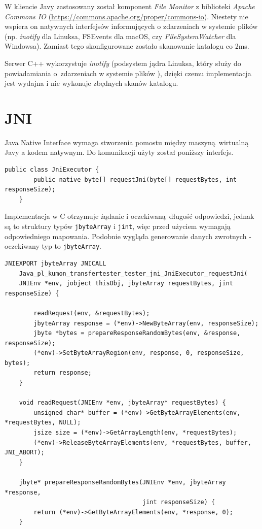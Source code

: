 W kliencie Javy zastosowany został komponent \textit{File Monitor} z biblioteki \textit{Apache Commons IO} (\url{https://commons.apache.org/proper/commons-io}). Niestety nie wspiera on natywnych interfejsów informujących o zdarzeniach w systemie plików (np. \textit{inotify} dla Linuksa, FSEvents dla macOS, czy \textit{FileSystemWatcher} dla Windowsa). Zamiast tego skonfigurowane zostało skanowanie katalogu co 2ms.

Serwer C++ wykorzystuje \textit{inotify} (podsystem jądra Linuksa, który służy do powiadamiania o~zdarzeniach w systemie plików \cite{inotify_man}), dzięki czemu implementacja jest wydajna i nie wykonuje zbędnych skanów katalogu.


\section{JNI}

Java Native Interface wymaga stworzenia pomostu między maszyną wirtualną Javy a kodem natywnym. Do komunikacji użyty został poniższy interfejs.

\begin{lstlisting}[caption={Metoda javy, która wymaga natywnej implementacji.},captionpos=b]
    public class JniExecutor {
        public native byte[] requestJni(byte[] requestBytes, int responseSize);
    }
\end{lstlisting}

Implementacja w C otrzymuje żądanie i oczekiwaną długość odpowiedzi, jednak są to struktury typów \texttt{jbyteArray} i \texttt{jint}, więc przed użyciem wymagają odpowiedniego mapowania. Podobnie wygląda generowanie danych zwrotnych - oczekiwany typ to \texttt{jbyteArray}.

\begin{lstlisting}[caption={Natywna implementacja w C.},captionpos=b]
    JNIEXPORT jbyteArray JNICALL 
    Java_pl_kumon_transfertester_tester_jni_JniExecutor_requestJni(
    JNIEnv *env, jobject thisObj, jbyteArray requestBytes, jint responseSize) {

        readRequest(env, &requestBytes);
        jbyteArray response = (*env)->NewByteArray(env, responseSize);
        jbyte *bytes = prepareResponseRandomBytes(env, &response, responseSize);
        (*env)->SetByteArrayRegion(env, response, 0, responseSize, bytes);
        return response;
    }

    void readRequest(JNIEnv *env, jbyteArray* requestBytes) {
        unsigned char* buffer = (*env)->GetByteArrayElements(env, *requestBytes, NULL);
        jsize size = (*env)->GetArrayLength(env, *requestBytes);
        (*env)->ReleaseByteArrayElements(env, *requestBytes, buffer, JNI_ABORT);
    }

    jbyte* prepareResponseRandomBytes(JNIEnv *env, jbyteArray *response,
                                      jint responseSize) {
        return (*env)->GetByteArrayElements(env, *response, 0);
    }
\end{lstlisting}


